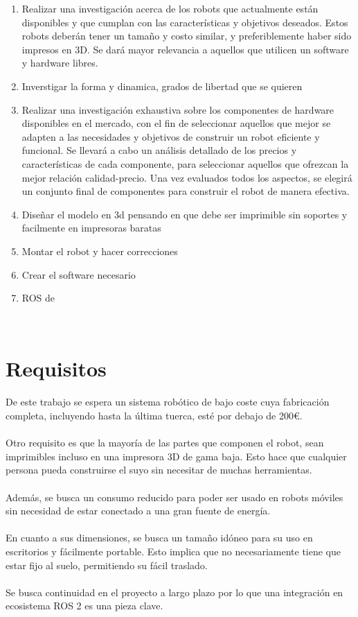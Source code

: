 \begin{enumerate}
    \item Realizar una investigación acerca de los robots que actualmente están disponibles y que cumplan con 
          las características y objetivos deseados. Estos robots deberán tener un tamaño y costo similar, y 
          preferiblemente haber sido impresos en 3D. Se dará mayor relevancia a aquellos que utilicen un software y hardware 
          libres.
    \item Inverstigar la forma y dinamica, grados de libertad que se quieren

    \item Realizar una investigación exhaustiva sobre los componentes de hardware disponibles en el mercado, con el fin de seleccionar 
          aquellos que mejor se adapten a las necesidades y objetivos de construir un robot eficiente y funcional. Se llevará 
          a cabo un análisis detallado de los precios y características de cada componente, para seleccionar aquellos 
          que ofrezcan la mejor relación calidad-precio. Una vez evaluados todos los aspectos, se elegirá un conjunto 
          final de componentes para construir el robot de manera efectiva. 
    
    \item Diseñar el modelo en 3d pensando en que debe ser imprimible sin soportes y facilmente en impresoras baratas
    \item Montar el robot y hacer correcciones
    \item Crear el software necesario
    \item ROS de 

  
\end{enumerate}\


\section{Requisitos}
\label{sec:requisitos}
De este trabajo se espera un sistema robótico de bajo coste cuya fabricación completa, incluyendo hasta la última tuerca, esté 
por debajo de 200€.\\\\
Otro requisito es que la mayoría de las partes que componen el robot, sean imprimibles incluso en una impresora 3D de gama baja. Esto 
hace que cualquier persona pueda construirse el suyo sin necesitar de muchas herramientas.\\\\
Además, se busca un consumo reducido para poder ser usado en robots móviles sin necesidad de estar conectado a una gran fuente de 
energía.\\\\
En cuanto a sus dimensiones, se busca un tamaño idóneo para su uso en escritorios y fácilmente portable. Esto implica que no necesariamente 
tiene que estar fijo al suelo, permitiendo su fácil traslado.\\\\
Se busca continuidad en el proyecto a largo plazo por lo que una integración en ecosistema ROS 2 es una pieza clave. 

